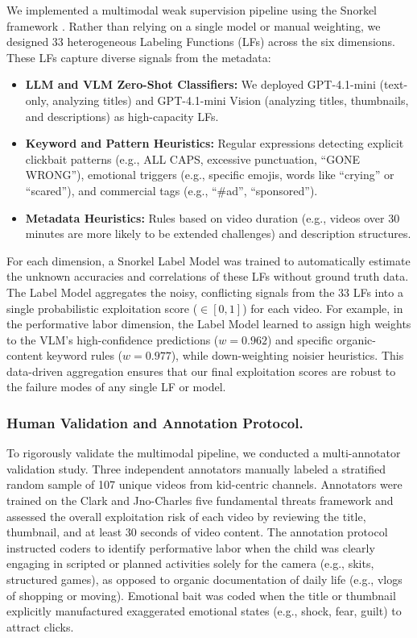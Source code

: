 \documentclass[]{ieeeaccess}
\begin{document}
We implemented a multimodal weak supervision pipeline using the Snorkel framework \cite{ratner2017snorkel}. Rather than relying on a single model or manual weighting, we designed 33 heterogeneous Labeling Functions (LFs) across the six dimensions. These LFs capture diverse signals from the metadata:
\begin{itemize}
    \item \textbf{LLM and VLM Zero-Shot Classifiers:} We deployed GPT-4.1-mini (text-only, analyzing titles) and GPT-4.1-mini Vision (analyzing titles, thumbnails, and descriptions) as high-capacity LFs.
    \item \textbf{Keyword and Pattern Heuristics:} Regular expressions detecting explicit clickbait patterns (e.g., ALL CAPS, excessive punctuation, ``GONE WRONG''), emotional triggers (e.g., specific emojis, words like ``crying'' or ``scared''), and commercial tags (e.g., ``\#ad'', ``sponsored'').
    \item \textbf{Metadata Heuristics:} Rules based on video duration (e.g., videos over 30 minutes are more likely to be extended challenges) and description structures.
\end{itemize}

For each dimension, a Snorkel Label Model was trained to automatically estimate the unknown accuracies and correlations of these LFs without ground truth data. The Label Model aggregates the noisy, conflicting signals from the 33 LFs into a single probabilistic exploitation score ($\in [0, 1]$) for each video. For example, in the performative labor dimension, the Label Model learned to assign high weights to the VLM's high-confidence predictions ($w=0.962$) and specific organic-content keyword rules ($w=0.977$), while down-weighting noisier heuristics. This data-driven aggregation ensures that our final exploitation scores are robust to the failure modes of any single LF or model.

\subsubsection{Human Validation and Annotation Protocol.}

To rigorously validate the multimodal pipeline, we conducted a multi-annotator validation study. Three independent annotators manually labeled a stratified random sample of 107 unique videos from kid-centric channels. Annotators were trained on the Clark and Jno-Charles \cite{clark2025child} five fundamental threats framework and assessed the overall exploitation risk of each video by reviewing the title, thumbnail, and at least 30 seconds of video content. The annotation protocol instructed coders to identify performative labor when the child was clearly engaging in scripted or planned activities solely for the camera (e.g., skits, structured games), as opposed to organic documentation of daily life (e.g., vlogs of shopping or moving). Emotional bait was coded when the title or thumbnail explicitly manufactured exaggerated emotional states (e.g., shock, fear, guilt) to attract clicks.
\end{document}

